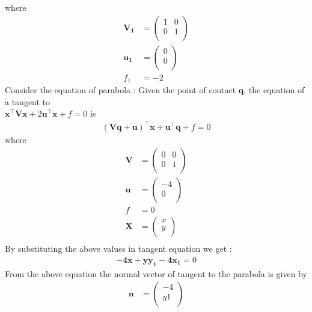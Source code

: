 \documentclass[journal,10pt,twocolumn]{article}
\let\vec\mathbf
\providecommand{\brak}[1]{\ensuremath{\left(#1\right)}}
\begin{document}
where
\begin{align}
\vec{V_1}&=\begin{pmatrix}
	1 & 0\\
	0 & 1\\
	\end{pmatrix} \\
    \vec{u_1}&=\begin{pmatrix}
	0\\
	0 \\
	\end{pmatrix} \\
	f_1&=-2
    \end{align}
Consider the equation of parabola :
Given the point of contact $\vec{q}$, the equation of a tangent to  \\ $\vec{x}^{\top}\vec{V}\vec{x}+2\vec{u}^{\top}\vec{x}+f=0$ is 
  \begin{align}
  \brak{\vec{V}\vec{q}+\vec{u}}^{\top}\vec{x}+\vec{u}^{\top}\vec{q}+f = 0
  \label{eq:conic_tangent_final}
  \end{align}
where 
\begin{align}
\vec{V}&=\begin{pmatrix}
	0 & 0\\
	0 & 1\\
	\end{pmatrix} \\
    \vec{u}&=\begin{pmatrix}
	-4 \\
	0 \\
	\end{pmatrix} \\
	f&=0 \\
	\vec{X}&=\begin{pmatrix}
	x \\
	y \\
	\end{pmatrix} \\
\end{align}
By substituting the above values in tangent equation we get :
\begin{align}
\vec{-4x+yy_1-4x_1}=0
\end{align}
From the above equation the normal vector of tangent to the parabola is given by 
\begin{align}
\vec{n}&=\begin{pmatrix}
	-4 \\
	y1 \\
	\end{pmatrix}
\end{align}
\end{document}
